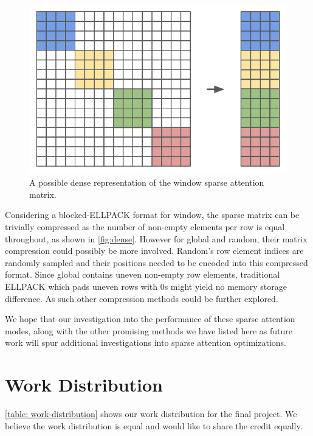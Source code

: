 \documentclass[11pt]{article}
\newcommand{\todo}[1]{[\textcolor{red}{\textit{TODO: }{#1}}]}
\begin{document}
\begin{figure}[t]
  \centering
  \includegraphics[width=\linewidth]{figures/dense.png}
  \caption{A possible dense representation of the window sparse attention matrix.}
 \label{fig:dense}
\end{figure}

Considering a blocked-ELLPACK \cite{blockedEll} format for window, the sparse matrix can be trivially compressed as the number of non-empty elements per row is equal throughout, as shown in \autoref{fig:dense}. However for global and random, their matrix compression could possibly be more involved. Random's row element indices are randomly sampled and their positions needed to be encoded into this compressed format. Since global contains uneven non-empty row elements, traditional ELLPACK which pads uneven rows with 0s might yield no memory storage difference. As such other compression methods could be further explored.

We hope that our investigation into the performance of these sparse attention modes, along with the other promising methods we have listed here as future work will spur additional investigations into sparse attention optimizations.



\section{Work Distribution}
\autoref{table: work-distribution} shows our work distribution for the final project. We believe the work distribution is equal and would like to share the credit equally.
\end{document}
